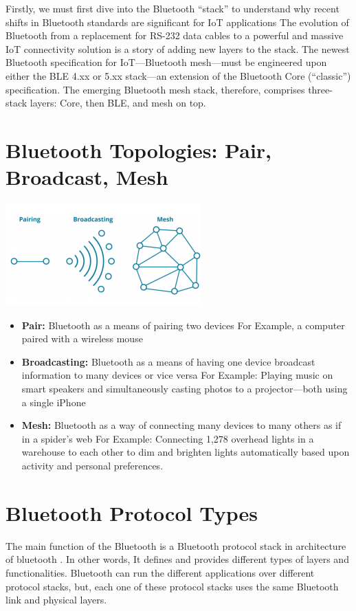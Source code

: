 \documentclass{report}
\begin{document}
\begin{multicols}{1}
    Firstly, we must first dive into the Bluetooth “stack” to understand why recent shifts in Bluetooth standards are significant for IoT applications The evolution of Bluetooth from a replacement for RS-232 data cables to a powerful and massive IoT connectivity solution is a story of adding new layers to the stack. The newest Bluetooth specification for IoT—Bluetooth mesh—must be engineered upon either the BLE 4.xx or 5.xx stack—an extension of the Bluetooth Core (“classic”) specification. The emerging Bluetooth mesh stack, therefore, comprises three-stack layers: Core, then BLE, and mesh on top.

    \section*{Bluetooth Topologies: Pair, Broadcast, Mesh}

    \includegraphics{BluetoothMesh}\\
    \begin{itemize}
        \item \textbf {Pair:} Bluetooth as a means of pairing two devices
For Example, a computer paired with a wireless mouse 
        \item \textbf {Broadcasting:} Bluetooth as a means of having one device broadcast information to many devices or vice versa
For Example: Playing music on smart speakers and simultaneously casting photos to a projector—both using a single iPhone
        \item \textbf {Mesh:} Bluetooth as a way of connecting many devices to many others as if in a spider’s web
For Example: Connecting 1,278 overhead lights in a warehouse to each other to dim and brighten lights automatically based upon activity and personal preferences.
    \end{itemize}

    \section*{Bluetooth Protocol Types}

    The main function of the Bluetooth is a Bluetooth protocol stack in architecture of bluetooth . In other words, It defines and provides different types of layers and functionalities. Bluetooth can run the different applications over different protocol stacks, but, each one of these protocol stacks uses the same Bluetooth link and physical layers.


\end{multicols}
\end{document}
